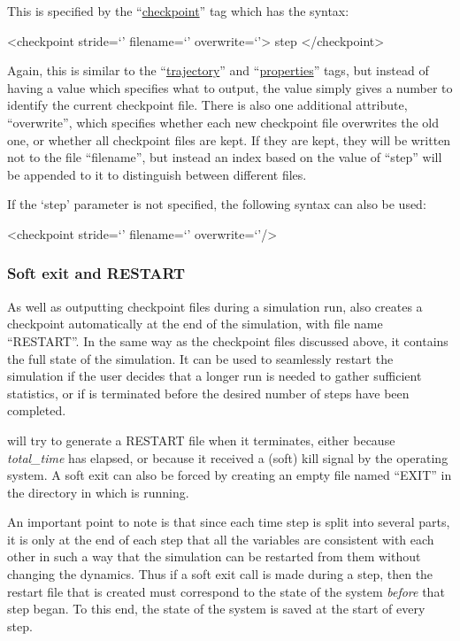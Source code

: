 \documentclass[11pt,english,fleqn]{report}
\newenvironment{code}{%
\footnotesize
\verbatim
}{
\endverbatim
\normalsize
}
\begin{document}
This is specified by the {}``\hyperref[CHECKPOINT]{checkpoint}'' tag
which has the syntax:

\begin{code}
<checkpoint stride=`' filename=`' overwrite=`'>
   step
</checkpoint>
\end{code}

Again, this is similar to the {}``\hyperref[TRAJECTORY]{trajectory}'' and
{}``\hyperref[PROPERTIES]{properties}''
tags, but instead of having a value which specifies what to output,
the value simply gives a number to identify the current checkpoint
file. There is also one additional attribute, {}``overwrite'', which
specifies whether each new checkpoint file overwrites the old one,
or whether all checkpoint files are kept. If they are kept, they will
be written not to the file {}``filename'', but instead an index
based on the value of {}``step'' will be appended to it to distinguish
between different files.

If the `step' parameter is not specified, the following syntax can
also be used:

\begin{code}
<checkpoint stride=`' filename=`' overwrite=`'/>
\end{code}


\subsubsection{Soft exit and RESTART}

As well as outputting checkpoint files during a simulation run, \ipi{} also
creates a checkpoint automatically at the end of the simulation, with
file name {}``RESTART''. In the same way as the checkpoint files discussed
above, it contains the full state of the simulation.
It can be used to seamlessly restart the simulation if the user decides
that a longer run is needed to gather sufficient statistics, or if \ipi{} is terminated
before the desired number of steps have been completed.

\ipi will try to generate a RESTART file when it terminates, either because
\emph{total\_time} has elapsed, or because it received a (soft) kill signal
by the operating system. A soft exit can also be forced by creating
an empty file named ``EXIT'' in
the directory in which \ipi is running.

An important point to note is that since each time step is split into
several parts, it is only at the end of each step that all the
variables are consistent with each other in such a way that the simulation
can be restarted from them without changing the dynamics. Thus if
a soft exit call is made during a step, then the restart file that
is created must correspond to the state of the system \emph{before}
that step began. To this end, the state of the system is saved at the
start of every step.
\end{document}
